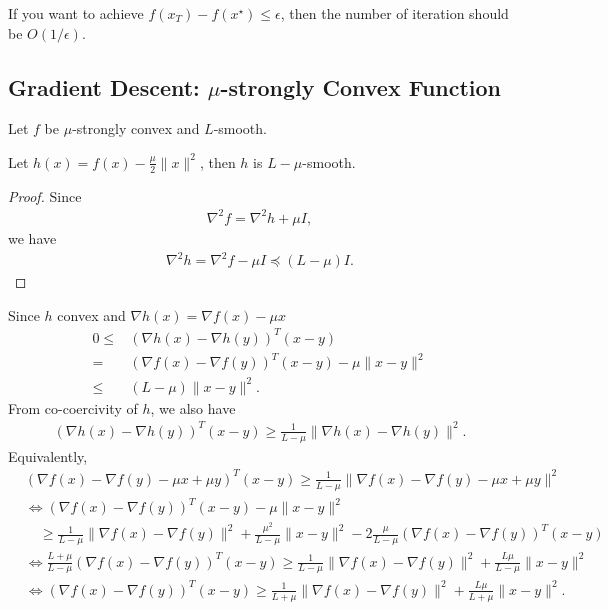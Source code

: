 \documentclass{article}
\begin{document}
\begin{corollary}
    If you want to achieve $f(x_T) - f(x^\star)\leq \epsilon$, then the number of iteration should be $O(1/\epsilon)$.
\end{corollary}


\subsection{Gradient Descent: $\mu$-strongly Convex Function}
Let $f$ be $\mu$-strongly convex and $L$-smooth.
\begin{theorem}
    Let $h(x) = f(x) - \frac{\mu}{2} \|x\|^2$, then $h$ is $L-\mu$-smooth.
\end{theorem}

\begin{proof}
Since
\begin{align}
    \nabla^2 f = \nabla^2 h + \mu I,
\end{align}
we have
\begin{align}
    \nabla^2 h = \nabla^2 f - \mu I \preceq (L-\mu) I.
\end{align}
\end{proof}

Since $h$ convex and $\nabla h (x) = \nabla f(x) - \mu x$
\begin{align}
    0\leq& (\nabla h(x) -\nabla h(y))^T (x-y)\\
    =& (\nabla f(x) - \nabla f(y))^T(x-y) - \mu\|x-y\|^2\\
    \leq& (L-\mu)\|x-y\|^2.
\end{align}
From co-coercivity of $h$, we also have
\begin{align}
    (\nabla h(x) - \nabla h(y))^T (x-y) \geq \frac{1}{L-\mu}\| \nabla h(x) - \nabla h(y)\|^2.
\end{align}
Equivalently,
\begin{align}
    &(\nabla f(x) - \nabla f(y) -\mu x + \mu y)^T (x-y) \geq \frac{1}{L-\mu}\| \nabla f(x) - \nabla f(y) - \mu x + \mu y\|^2\\
    &\Leftrightarrow 
    (\nabla f(x) - \nabla f(y))^T(x-y) -\mu \|x-y\|^2 \nonumber\\
    &\quad\geq \frac{1}{L-\mu}\| \nabla f(x) - \nabla f(y)\|^2 +\frac{\mu^2}{L-\mu} \|x-y\|^2- 2\frac{\mu}{L-\mu} (\nabla f(x) - \nabla f(y))^T(x-y)\\
    &\Leftrightarrow 
    \frac{L+\mu}{L-\mu} (\nabla f(x) - \nabla f(y))^T(x-y) \geq \frac{1}{L-\mu}\| \nabla f(x) - \nabla f(y)\|^2 +\frac{L\mu}{L-\mu} \|x-y\|^2\\
    &\Leftrightarrow 
    (\nabla f(x) - \nabla f(y))^T(x-y) \geq \frac{1}{L+\mu}\| \nabla f(x) - \nabla f(y)\|^2 +\frac{L\mu}{L+\mu} \|x-y\|^2.
\end{align}
\end{document}
